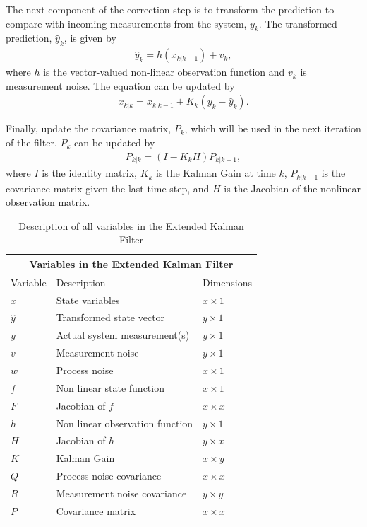 \begin{enumerate}
    \noindent  The next component of the correction step is to transform the prediction to compare with incoming measurements from the system, $y_k$. The transformed prediction, $\hat y_k$, is given by
    \begin{align*}
        \hat y_k = h( x_{k|k-1} ) + v_k,
    \end{align*}
   where $h$ is the vector-valued non-linear observation function and $v_k$ is measurement noise. The equation can be updated by 
     \begin{align*} 
        x_{k|k} = x_{k |k-1} + K_k(y_{k} - \hat y_{k}).
    \end{align*}
    
    \noindent Finally, update the covariance matrix, $P_k $, which will be used in the next iteration of the filter. $P_k $ can be updated by
    \begin{align*} 
        P_{k|k} = (I - K_k H) P_{k | k-1},
    \end{align*}
    where $I$ is the identity matrix, $K_k$ is the Kalman Gain at time $k$, $P_{k | k-1}$ is the covariance matrix given the last time step, and $H$ is the Jacobian of the nonlinear observation matrix. \\
\end{enumerate} 
\clearpage
\begin{center}
\begin{table}
\centering
\caption{Description of all variables in the Extended Kalman Filter} \label{tab:sometab}
\begin{tabular}{ |p{2cm}||p{5cm}|p{2cm}| }
    \hline
    \multicolumn{3}{|c|}{Variables in the Extended Kalman Filter } \\ 
    \hline
    Variable & Description & Dimensions \\
    \hline
    $x$ & State variables  & $x \times 1$ \\
    $\hat y$ & Transformed state vector  & $y \times 1$ \\
    $y$ & Actual system measurement(s) & $y \times 1$ \\
    $v$ & Measurement noise & $y \times 1$\\
    $w$ & Process noise & $x \times 1$\\
    $f$ & Non linear state function  & $x \times 1 $  \\ 
    $F$ & Jacobian of $f$  & $x \times x $  \\ 
    $h$ & Non linear observation function & $y \times 1$\\
    $H$ & Jacobian of $h$ & $y \times x$\\
    $K$ & Kalman Gain  & $x \times y$\\
    $Q$ & Process noise covariance  & $x \times x$ \\
    $R$ & Measurement noise covariance &  $y \times y$\\
    $P$ & Covariance matrix & $x \times x $  \\ 
    \hline
\end{tabular}
\end{table}
\end{center}
